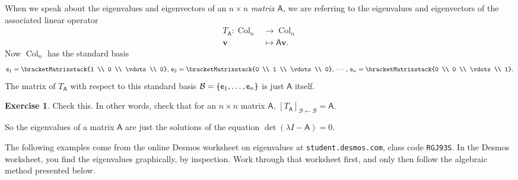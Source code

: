 \documentclass[a4paper,11pt]{book}
\theoremstyle{definition}
\newtheorem{exercise}{Exercise}
\newcommand{\ve}[1]{\mathbf{#1}}
\newcommand{\mat}[1]{\mathsf{#1}}
\newcommand{\basis}[1]{{\mathcal #1}}
\newcommand{\cmatrix}[1]{\bracketMatrixstack{#1}}
\newcommand{\bmark}{\raisebox{.53ex}{\rule{.2em}{.1ex}}}
\newcommand{\bopen}{{\protect\ooalign{\{\cr\hfil\bmark\hfil\cr}}}
\newcommand{\bclose}{{\protect\ooalign{\}\cr\hfil\bmark\hfil\cr}}}
\DeclareMathOperator{\Col}{Col}
\begin{document}
When we speak about the eigenvalues and eigenvectors of an $n\times n$ {\em matrix} $\mat{A}$, we are referring to the eigenvalues and eigenvectors of the associated linear operator
\begin{align*}
  T_{\mat{A}} : \Col_n &\rightarrow \Col_n \\
         \ve{v} & \mapsto \mat{A} \ve{v} . 
\end{align*}
Now $\Col_n$ has the standard basis
\[
 \mat{e}_1 = \cmatrix{1 \\ 0  \\ \vdots \\ 0}, \, \mat{e}_2 = \cmatrix{0 \\ 1 \\ \vdots \\ 0}, \, \cdots \, , \, \mat{e}_n = \cmatrix{0 \\ 0 \\ \vdots \\ 1}. 
\]
The matrix of $T_{\mat{A}}$ with respect to this standard basis $\basis{B} = \bopen \mat{e}_1, \ldots, \mat{e}_n \bclose$ is just $\mat{A}$ itself.
 \begin{exercise} Check this. In other words, check that for an $n \times n$ matrix $\mat{A}$, $[T_{\mat{A}}]_{\basis{B} \leftarrow \basis{B}} = \mat{A}$.
\end{exercise} 
So the eigenvalues of a matrix $\mat{A}$ are just the solutions of the equation $\det (\lambda I - \mat{A}) = 0$.

 
The following examples come from the online Desmos worksheet on eigenvalues at {\tt student.desmos.com}, class code {\tt RGJ93S}. In the Desmos worksheet, you find the eigenvalues graphically, by inspection. Work through that worksheet first, and only then follow the algebraic method presented below.
\end{document}
